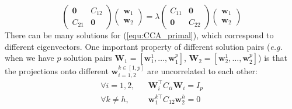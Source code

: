 \documentclass[a4paper]{article}
\begin{document}
\begin{equation}
    \left(\begin{array}{cc}
        \mathbf{0} & C_{12} \\
        C_{21}     & \mathbf{0}
    \end{array}
    \right) 
    \left( \begin{array}{c} \mathbf{w}_1\\ \mathbf{w}_2 \end{array} \right)= 
    \lambda 
    \left(\begin{array}{cc}
        C_{11} & \mathbf{0} \\
        \mathbf{0}  & C_{22}
    \end{array}
    \right)
    \left( \begin{array}{c} \mathbf{w}_1\\ \mathbf{w}_2 \end{array} \right)
    \label{equ:CCA_primal}
\end{equation}
There can be many solutions for (\ref{equ:CCA_primal}), which correspond to different eigenvectors. One important 
property of different solution pairs (\emph{e.g.} when we have $p$ solution pairs $\mathbf{W}_1=[\mathbf{w}_1^1,\ldots, \mathbf{w}_1^p]$, $\mathbf{W}_2=[\mathbf{w}_2^1,\ldots, \mathbf{w}_2^p]$) is that the projections onto different $\mathbf{w}_{i=1,2}^{k\in [1,p]}$ are 
uncorrelated to each other:     
\footnotesize
\begin{equation}
    \begin{array}{rcl}
        \forall i=1,2, & &    \mathbf{W}_i^{\top} C_{ii}\mathbf{W}_i=I_p \\
        \forall k\neq h, & &  \mathbf{w}_1^{k\top} C_{12}  \mathbf{w}_2^h=0 
    \end{array}
\end{equation}
\normalsize
\end{document}
